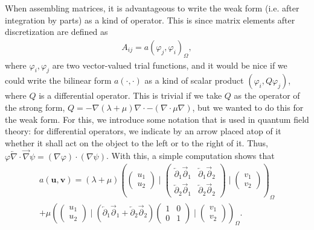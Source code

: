 \documentclass{article}
\newcommand{\leftpartial}{\overleftarrow \partial}
\newcommand{\rightpartial}{\overrightarrow \partial}
\renewcommand{\div}{\nabla\cdot}
\renewcommand{\vec}[1]{{\mathbf #1}}
\begin{document}
When assembling matrices, it is advantageous to write the weak form
(i.e. after integration by parts) as a kind of operator. This is since matrix
elements after discretization are defined as
\begin{gather*}
  A_{ij} = a(\varphi_j,\varphi_i)_\Omega,
\end{gather*}
where $\varphi_i,\varphi_j$ are two vector-valued trial functions, and it
would be nice if we could write the bilinear form $a(\cdot,\cdot)$ as a kind
of scalar product $(\varphi_i, Q \varphi_j)$, where $Q$ is a differential
operator. This is trivial if we take $Q$ as the operator of the strong form,
$Q=-\nabla (\lambda+\mu) \div - (\nabla \cdot \mu \nabla)$, but we wanted to
do this for the weak form. For this, we introduce some notation that is used
in quantum field theory: for differential operators, we indicate by an arrow
placed atop of it whether it shall act on the object to the left or to the
right of it. Thus, 
$\varphi \overleftarrow\nabla \cdot \overrightarrow\nabla \psi
=(\nabla\varphi)\cdot(\nabla\psi)$. With this, a simple computation shows 
that 
\begin{multline*}
  a(\vec u,\vec v)
  =
  (\lambda+\mu)
  \left(
    \begin{pmatrix}
      u_1 \\ u_2
    \end{pmatrix}
    \mid
    \begin{pmatrix}
      \leftpartial_1 \rightpartial_1 &
      \leftpartial_1 \rightpartial_2 \\
      \leftpartial_2 \rightpartial_1 &
      \leftpartial_2 \rightpartial_2
    \end{pmatrix}
    \mid
    \begin{pmatrix}
      v_1 \\ v_2
    \end{pmatrix}
  \right)_\Omega
  \\
  +
  \mu
  \left(
    \begin{pmatrix}
      u_1 \\ u_2
    \end{pmatrix}
    \mid
    \left(
      \leftpartial_1 \rightpartial_1 + 
      \leftpartial_2 \rightpartial_2
    \right)
    \begin{pmatrix}
      1 & 0 \\
      0 & 1
    \end{pmatrix}
    \mid
    \begin{pmatrix}
      v_1 \\ v_2
    \end{pmatrix}
  \right)_\Omega.
\end{multline*}
\end{document}
